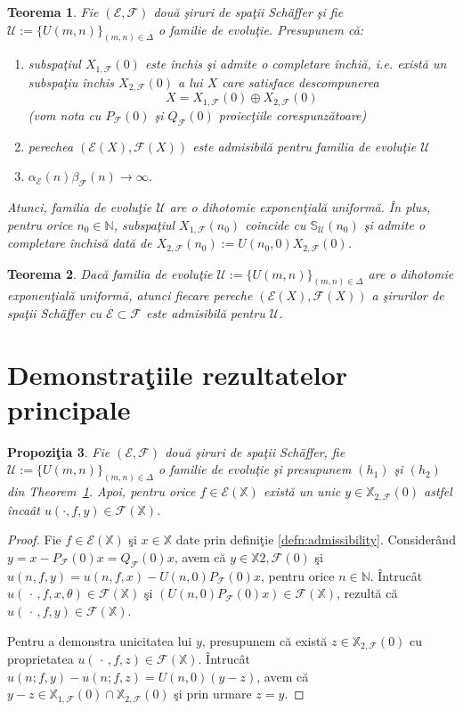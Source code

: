 \documentclass[ a4paper, 12pt]{report}
\newcommand{\E}{\mathcal{E}}
\newcommand{\F}{\mathcal{F}}
\newcommand{\N}{\mathbb{N}}
\newcommand{\X}{\mathbb{X}}
\newtheorem{theorem}{\bf Teorema}[section]
\newtheorem{prop}[theorem]{\bf Propozi\c tia }
\theoremstyle{definition}
\theoremstyle{remark}
\numberwithin{equation}{section}
\begin{document}
\begin{theorem}
\label{artC:mainthm}
Fie $(\E,\F)$ dou\u a \c siruri de spa\c tii Sch\"{a}ffer \c si fie \\ $\mathcal{U}:=\{U(m,n)\}_{(m,n)\in\Delta}$ o familie de evolu\c tie.
Presupunem c\u a:
\begin{enumerate}
\item[$(h_1)$] subspa\c tiul $X_{1,\F}(0)$ este \^inchis \c si admite o completare \^inchi\u a,
 i.e. exist\u a un subspa\c tiu \^inchis $X_{2,\F}(0)$ a lui $X$ care satisface descompunerea
 $$X=X_{1,\F}(0)\oplus X_{2,\F}(0)$$
 (vom nota cu $P_{\F}(0)$ \c si $Q_{\F}(0)$ proiec\c tiile corespunz\u atoare)
\item[$(h_2)$] perechea $(\E(X),\F(X))$ este admisibil\u a pentru familia de evolu\c tie $\mathcal{U}$
\item[$(h_3)$] $\alpha_{\E}(n)\beta_{\F}(n) \to\infty$.
\end{enumerate}
Atunci, familia de evolu\c tie $\mathcal{U}$ are o dihotomie exponen\c tial\u a uniform\u a. \^In plus,
pentru orice $n_0\in\N$, subspa\c tiul $X_{1,\F}(n_0)$ coincide cu $\mathbb{S}_{\mathcal{U}}(n_0)$
\c si admite o completare \^inchis\u a dat\u a de  $X_{2,\F}(n_0):=U(n_0,0)X_{2,\F}(0)$.
\end{theorem}


\begin{theorem}
\label{artC:conversemainthm}
Dac\u a familia de evolu\c tie $\mathcal{U}:=\{U(m,n)\}_{(m,n)\in\Delta}$ are o dihotomie exponen\c tial\u a uniform\u a, atunci
fiecare pereche $(\E(X),\F(X))$ a \c sirurilor de spa\c tii Sch\"{a}ffer cu $\E\subset\F$
este admisibil\u a pentru $\mathcal{U}$.
\end{theorem}




\section{Demonstra\c tiile rezultatelor principale}


\begin{prop}
\label{artC:unicity}
Fie $(\E,\F)$ dou\u a \c siruri de spa\c tii Sch\"{a}ffer,
fie $\mathcal{U}:=\{U(m,n)\}_{(m,n)\in\Delta}$ o familie de evolu\c tie \c si
presupunem $(h_1)$ \c si $(h_2)$ din Theorem~\ref{artC:mainthm}.
Apoi, pentru orice $f\in\E(\X)$ exist\u a un unic $y\in\X_{2,\F}(0)$ astfel \^inca\^at
$u(\cdot,f,y)\in\F(\X)$.
\end{prop}
\begin{proof}
Fie $f\in \E(\X)$ \c si $x\in\X$ date prin defini\c tie \ref{defn:admissibility}.
Consider\^and $y=x-P_{\F}(0)x=Q_{\F}(0)x$, avem c\u a $y\in\X{2,\F}(0)$ \c si
$u(n,f,y)=u(n,f,x)- U(n,0)P_{\F}(0)x$, pentru orice $n\in\N$.
\^Intruc\^at $u(\,\cdot\,,f,x,\theta)\in\F(\X)$ \c si $(U(n,0)P_{\F}(0)x)\in\F(\X)$,
rezult\u a c\u a $u(\,\cdot\,,f,y)\in\F(\X)$.

Pentru a demonstra unicitatea lui $y$, presupunem c\u a exist\u a $z\in\X_{2,\F}(0)$ cu proprietatea
$u(\,\cdot\,,f,z)\in\F(\X)$.
\^Intruc\^at $u(n;f,y)-u(n;f,z)=U(n,0)(y-z)$,
avem c\u a $y-z\in\X_{1,\F}(0)\cap\X_{2,\F}(0)$ \c si prin urmare $z=y$.

\end{proof}
\end{document}
